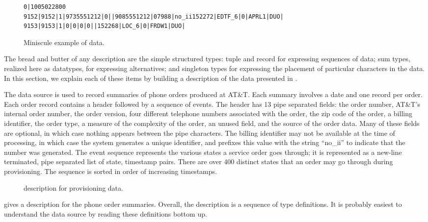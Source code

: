 \begin{figure*}
{\scriptsize
\begin{verbatim}
0|1005022800
9152|9152|1|9735551212|0||9085551212|07988|no_ii152272|EDTF_6|0|APRL1|DUO|
9153|9153|1|0|0|0|0||152268|LOC_6|0|FRDW1|DUO|
\end{verbatim}
}
  \caption{Miniscule example of \dibbler{} data.}
  \label{figure:dibbler-records}
\end{figure*}

The bread and butter of any \padsml{} description are the simple
structured types: tuple and record for expressing sequences of data;
sum types, realized here as datatypes, for expressing alternatives;
and singleton types for expressing the placement of particular
characters in the data.  In this section, we explain each of these
items by building a description of the \dibbler{} data presented in
.

The \dibbler{} data source is used to record summaries of phone orders
produced at AT\&T.  Each summary involves a date and one record per
order.  Each order record contains a header followed by a sequence of
events.  The header has 13 pipe separated fields: the order number,
AT\&T's internal order number, the order version, four different
telephone numbers associated with the order, the zip code of the
order, a billing identifier, the order type, a measure of the
complexity of the order, an unused field, and the source of the order
data.  Many of these fields are optional, in which case nothing
appears between the pipe characters.  The billing identifier may not
be available at the time of processing, in which case the system
generates a unique identifier, and prefixes this value with the string
``no\_ii'' to indicate that the number was generated. The event sequence
represents the various states a service order goes through; it is
represented as a new-line terminated, pipe separated list of state,
timestamp pairs.  There are over 400 distinct states that an order may
go through during provisioning.  The sequence is sorted in order of
increasing timestamps.

\begin{figure}
  
  \caption{\padsml{} description for \dibbler{} provisioning data.}
  \label{figure:sirius_pml}
\end{figure}

 gives a \padsml{} description for the
\dibbler{} phone order summaries. Overall, the description is a
sequence of type definitions. It is probably easiest to understand the
data source by reading these definitions bottom up.

